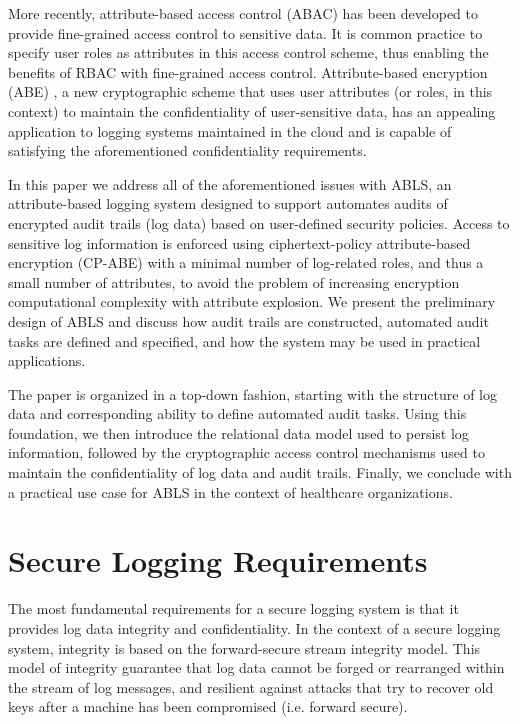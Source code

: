 \documentclass{sig-alternate}
\begin{document}
More recently, attribute-based access control (ABAC) \cite{shen2006attribute} \cite{alipour2011policy} \cite{zhu2008attribute}
has been developed to provide fine-grained access control to sensitive data. It is common practice to specify user roles as attributes
in this access control scheme, thus enabling the benefits of RBAC with fine-grained access control.
Attribute-based encryption (ABE) \cite{Goyal2006-ABAC}, a new cryptographic scheme that uses 
user attributes (or roles, in this context) to maintain the confidentiality of user-sensitive data, has an appealing application
to logging systems maintained in the cloud and is capable of satisfying the aforementioned confidentiality 
requirements. 

In this paper we address all of the aforementioned issues with ABLS, an attribute-based logging system designed
to support automates audits of encrypted audit trails (log data) based on user-defined security policies. Access to
sensitive log information is enforced using ciphertext-policy attribute-based encryption (CP-ABE) with a minimal number
of log-related roles, and thus a small number of attributes, to avoid the problem of increasing encryption computational
complexity with attribute explosion. We present the preliminary design of ABLS and discuss how audit trails are 
constructed, automated audit tasks are defined and specified, and how the system may be used in practical applications.

The paper is organized in a top-down fashion, starting with the structure of log data and corresponding ability
to define automated audit tasks. Using this foundation, we then introduce the relational data model used to persist
log information, followed by the cryptographic access control mechanisms used to maintain the confidentiality
of log data and audit trails. Finally, we conclude with a practical use case for ABLS in the context of healthcare 
organizations.

\section{Secure Logging Requirements}
The most fundamental requirements for a secure logging system is that it provides log data integrity
and confidentiality. In the context of a secure logging system, integrity is based on the forward-secure
stream integrity model. This model of integrity guarantee that log data cannot be forged or rearranged 
within the stream of log messages, and resilient against attacks that try to recover old keys after a 
machine has been compromised (i.e. forward secure).
\end{document}
